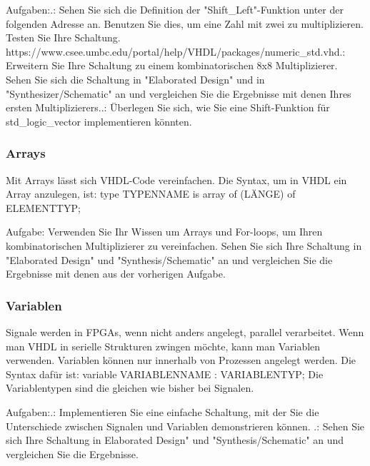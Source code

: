 \documentclass{article}
\begin{document}
Aufgaben:.: Sehen Sie sich die Definition der "Shift\_Left"-Funktion unter der folgenden Adresse an. Benutzen Sie dies, um eine Zahl mit zwei zu multiplizieren. Testen Sie Ihre Schaltung.\newline
https://www.csee.umbc.edu/portal/help/VHDL/packages/numeric\_std.vhd.: Erweitern Sie Ihre Schaltung zu einem kombinatorischen 8x8 Multiplizierer. Sehen Sie sich die Schaltung in "Elaborated Design" und in "Synthesizer/Schematic" an und vergleichen Sie die Ergebnisse mit denen Ihres ersten Multiplizierers..: \"Uberlegen Sie sich, wie Sie eine Shift-Funktion f\"ur std\_logic\_vector implementieren k\"onnten.\newline

\subsubsection{Arrays}
Mit Arrays l\"asst sich VHDL-Code vereinfachen. Die Syntax, um in VHDL ein Array anzulegen, ist:\newline
type TYPENNAME is array of (L\"ANGE) of ELEMENTTYP;\newline

Aufgabe:\newline
Verwenden Sie Ihr Wissen um Arrays und For-loops, um Ihren kombinatorischen Multiplizierer zu vereinfachen. Sehen Sie sich Ihre Schaltung in "Elaborated Design" und "Synthesis/Schematic" an und vergleichen Sie die Ergebnisse mit denen aus der vorherigen Aufgabe.

\subsubsection{Variablen}
Signale werden in FPGAs, wenn nicht anders angelegt, parallel verarbeitet. Wenn man VHDL in serielle Strukturen zwingen m\"ochte, kann man Variablen verwenden. Variablen k\"onnen nur innerhalb von Prozessen angelegt werden. Die Syntax daf\"ur ist:\newline
variable VARIABLENNAME : VARIABLENTYP;\newline
Die Variablentypen sind die gleichen wie bisher bei Signalen.\newline

Aufgaben:.: Implementieren Sie eine einfache Schaltung, mit der Sie die Unterschiede zwischen Signalen und Variablen demonstrieren k\"onnen. .: Sehen Sie sich Ihre Schaltung in Elaborated Design" und "Synthesis/Schematic" an und vergleichen Sie die Ergebnisse.\newline
\end{document}
